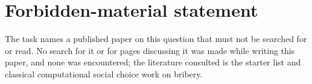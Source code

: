 \section*{Forbidden-material statement}
The task names a published paper on this question that must not be searched for or read. No search for it or for pages discussing it was made while writing this paper, and none was encountered; the literature consulted is the starter list and classical computational social choice work on bribery.
